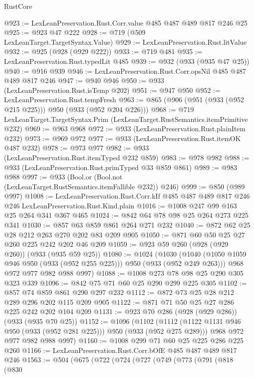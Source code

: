 \begin{lexlean}{RustCore}
\begin{coremodule}
@923 := LexLeanPreservation.Rust.Corr.value @485 @487 @489 @817 @246 @25
@925 := @923 @47 @222
@928 := @719 (@509 LexLeanTarget.TargetSyntax.Value)
@929 := LexLeanPreservation.Rust.litValue
@932 := @925 (@928 (@929 @222))
@933 := @719 @481
@935 := LexLeanPreservation.Rust.typedLit @485
@939 := @932 (@933 (@935 @47 @25))
@940 := @916 @939
@946 := LexLeanPreservation.Rust.Corr.opsNil @485 @487 @489 @817 @246
@947 := @940 @946
@950 := @933 (LexLeanPreservation.Rust.isTemp @202)
@951 := @947 @950
@952 := LexLeanPreservation.Rust.tempFresh
@963 := @865 (@906 (@951 (@933 (@952 @215 @225))) @950 (@933 (@952 @204 @226)))
@968 := @719 LexLeanTarget.TargetSyntax.Prim (LexLeanTarget.RustSemantics.itemPrimitive @232)
@969 := @963 @968
@972 := @933 (LexLeanPreservation.Rust.plainItem @232)
@973 := @969 @972
@977 := @933 (LexLeanPreservation.Rust.itemOK @487 @232)
@978 := @973 @977
@982 := @933 (LexLeanPreservation.Rust.itemTyped @232 @859)
@983 := @978 @982
@988 := @933 (LexLeanPreservation.Rust.primTyped @33 @859 @861)
@989 := @983 @988
@997 := @933 (Bool.or (Bool.not (LexLeanTarget.RustSemantics.itemFallible @232)) @246)
@999 := @850 (@989 @997)
@1008 := LexLeanPreservation.Rust.Corr.kIf
    @485
    @487
    @489
    @817
    @246
    @246
    LexLeanPreservation.Rust.Kind.plain
@1016 := @1008 @247 @99 @163 @25 @264 @341 @367 @465
@1024 := @842 @64 @78 @98 @25 @264 @273 @225 @341
@1030 := @857 @63 @859 @861 @264 @271 @232
@1040 := @872 @62 @25 @28 @212 @263 @270 @202 @83 @209 @905
@1050 := @871 @60 @50 @25 @27 @260 @225 @242 @202 @46 @209
@1059 := @923 @59 @260 (@928 (@929 @260)) (@933 (@935 @59 @25))
@1080 := @1024
    (@1030
      (@1040 (@1050 @1059 @946 @950 (@933 (@952 @255 @225))) @950 (@933 (@952 @249 @263)))
      @968
      @972
      @977
      @982
      @988
      @997)
@1088 := @1008 @273 @78 @98 @25 @290 @305 @323 @339
@1096 := @842 @75 @71 @60 @25 @290 @299 @225 @305
@1102 := @857 @74 @859 @861 @290 @297 @232
@1112 := @872 @73 @25 @28 @212 @289 @296 @202 @115 @209 @905
@1122 := @871 @71 @50 @25 @27 @286 @225 @242 @202 @104 @209
@1131 := @923 @70 @286 (@928 (@929 @286)) (@933 (@935 @70 @25))
@1152 := @1096
    (@1102
      (@1112 (@1122 @1131 @946 @950 (@933 (@952 @281 @225))) @950 (@933 (@952 @275 @289)))
      @968
      @972
      @977
      @982
      @988
      @997)
@1160 := @1008 @299 @71 @60 @25 @225 @286 @225 @260
@1166 := LexLeanPreservation.Rust.Corr.bOfE @485 @487 @489 @817 @246
@1563 := @504
    (@675
      (@722
        (@724
          (@727
            (@749
              (@773
                (@791
                  (@818
                    (@830

\end{coremodule}
\end{lexlean}
